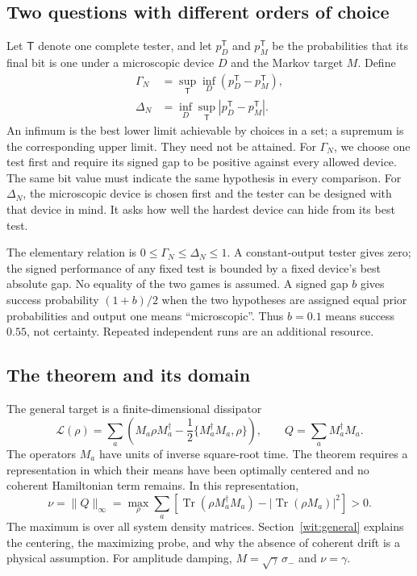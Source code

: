 \documentclass[11pt,a4paper]{article}
\numberwithin{equation}{section}
\theoremstyle{remark}
\DeclareMathOperator{\Tr}{Tr}
\begin{document}
\subsection{Two questions with different orders of choice}

Let $\mathsf T$ denote one complete tester, and let $p_D^{\mathsf T}$ and
$p_M^{\mathsf T}$ be the probabilities that its final bit is one under a
microscopic device $D$ and the Markov target $M$. Define
\begin{align}
 \Gamma_N&=\sup_{\mathsf T}\inf_D
       (p_D^{\mathsf T}-p_M^{\mathsf T}),\label{eq:gamma-game}\\
 \Delta_N&=\inf_D\sup_{\mathsf T}
       |p_D^{\mathsf T}-p_M^{\mathsf T}|.\label{eq:delta-game}
\end{align}
An infimum is the best lower limit achievable by choices in a set; a
supremum is the corresponding upper limit. They need not be attained.
For $\Gamma_N$, we choose one test first and require its signed gap to be
positive against every allowed device. The same bit value must indicate
the same hypothesis in every comparison. For $\Delta_N$, the microscopic
device is chosen first and the tester can be designed with that device
in mind. It asks how well the hardest device can hide from its best test.

The elementary relation is $0\le\Gamma_N\le\Delta_N\le1$.
A constant-output tester gives zero; the signed performance of any fixed
test is bounded by a fixed device's best absolute gap. No equality of the
two games is assumed. A signed gap $b$ gives success probability
$(1+b)/2$ when the two hypotheses are assigned equal prior probabilities
and output one means ``microscopic''. Thus $b=0.1$ means success $0.55$,
not certainty. Repeated independent runs are an additional resource.

\subsection{The theorem and its domain}

The general target is a finite-dimensional dissipator
\begin{equation}
 \mathcal L(\rho)=\sum_a\left(M_a\rho M_a^\dagger
 -\frac12\{M_a^\dagger M_a,\rho\}\right),
 \qquad Q=\sum_aM_a^\dagger M_a.
\end{equation}
The operators $M_a$ have units of inverse square-root time. The theorem
requires a representation in which their means have been optimally
centered and no coherent Hamiltonian term remains. In this representation,
\begin{equation}
 \nu=\|Q\|_\infty
 =\max_\rho\sum_a\left[\Tr(\rho M_a^\dagger M_a)
 -|\Tr(\rho M_a)|^2\right]>0.
 \label{eq:rate-definition}
\end{equation}
The maximum is over all system density matrices. Section~\ref{wit:general}
explains the centering, the maximizing probe, and why the absence of
coherent drift is a physical assumption. For amplitude damping,
$M=\sqrt\gamma\,\sigma_-$ and $\nu=\gamma$.
\end{document}
